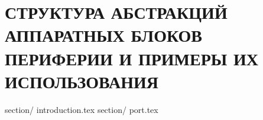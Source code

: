 \part{СТРУКТУРА АБСТРАКЦИЙ АППАРАТНЫХ БЛОКОВ ПЕРИФЕРИИ И ПРИМЕРЫ ИХ ИСПОЛЬЗОВАНИЯ}\label{module:op}
	{section/}	{introduction.tex}					%
	{section/}	{port.tex}							%